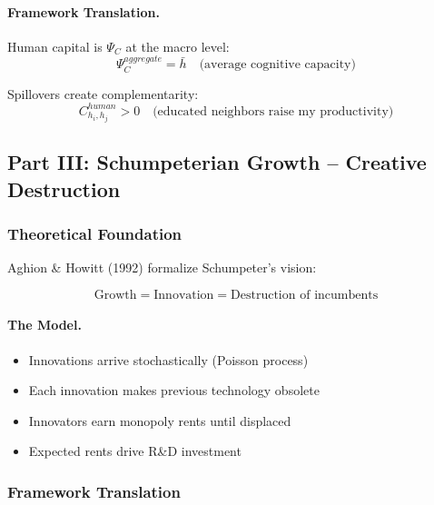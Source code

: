 \paragraph{Framework Translation.}
Human capital is $\Psi_C$ at the macro level:
\begin{equation}
\Psi_C^{aggregate} = \bar{h} \quad \text{(average cognitive capacity)}
\end{equation}

Spillovers create complementarity:
\begin{equation}
C_{h_i, h_j}^{human} > 0 \quad \text{(educated neighbors raise my productivity)}
\end{equation}

\subsection{Part III: Schumpeterian Growth – Creative Destruction}

\subsubsection{Theoretical Foundation}

Aghion \& Howitt (1992) formalize Schumpeter's vision:

\begin{equation}
\boxed{
\text{Growth} = \text{Innovation} = \text{Destruction of incumbents}
}
\label{eq:creative-destruction}
\end{equation}

\paragraph{The Model.}
\begin{itemize}
    \item Innovations arrive stochastically (Poisson process)
    \item Each innovation makes previous technology obsolete
    \item Innovators earn monopoly rents until displaced
    \item Expected rents drive R\&D investment
\end{itemize}

\subsubsection{Framework Translation}

